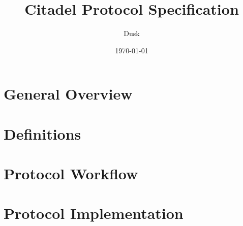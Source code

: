 \documentclass[10pt]{article}
\title{Citadel Protocol Specification}
\date{\today}
\author{Dusk}
\newcounter{protocol}
\begin{document}
\maketitle

\tableofcontents
\pagebreak 

\section{General Overview}
\label{sec:overview}


\section{Definitions}
\label{sec:definitions}


\section{Protocol Workflow}
\label{sec:protocol}


\section{Protocol Implementation}
\label{sec:implementation}

\end{document}
